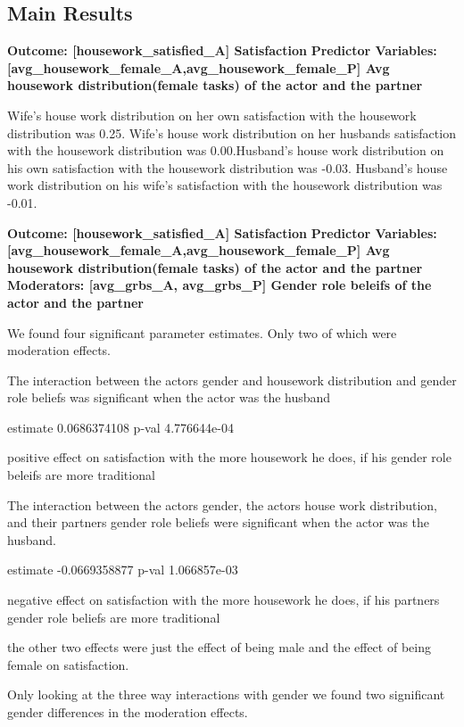 \documentclass[
  english,
  man,floatsintext]{apa6}
\begin{document}
\hypertarget{main-results}{%
\subsection{Main Results}\label{main-results}}

\textbf{Outcome: {[}housework\_satisfied\_A{]} Satisfaction }
\textbf{Predictor Variables: {[}avg\_housework\_female\_A,avg\_housework\_female\_P{]} Avg} \textbf{housework distribution(female tasks) of the actor and the partner}

Wife's house work distribution on her own satisfaction with the housework distribution was 0.25. Wife's house work distribution on her husbands satisfaction with the housework distribution was 0.00.Husband's house work distribution on his own satisfaction with the housework distribution was -0.03. Husband's house work distribution on his wife's satisfaction with the housework distribution was -0.01.

\textbf{Outcome: {[}housework\_satisfied\_A{]} Satisfaction}
\textbf{Predictor Variables: {[}avg\_housework\_female\_A,avg\_housework\_female\_P{]} Avg} \textbf{housework distribution(female tasks) of the actor and the partner }
\textbf{Moderators: {[}avg\_grbs\_A, avg\_grbs\_P{]} Gender role beleifs of the actor and the partner }

We found four significant parameter estimates. Only two of which were moderation effects.

The interaction between the actors gender and housework distribution and gender role beliefs was significant when the actor was the husband

estimate 0.0686374108
p-val 4.776644e-04

positive effect on satisfaction with the more housework he does, if his gender role beleifs are more traditional

The interaction between the actors gender, the actors house work distribution, and their partners gender role beliefs were significant when the actor was the husband.

estimate -0.0669358877
p-val 1.066857e-03

negative effect on satisfaction with the more housework he does, if his partners gender role beliefs are more traditional

the other two effects were just the effect of being male and the effect of being female on satisfaction.

Only looking at the three way interactions with gender we found two significant gender differences in the moderation effects.
\end{document}
